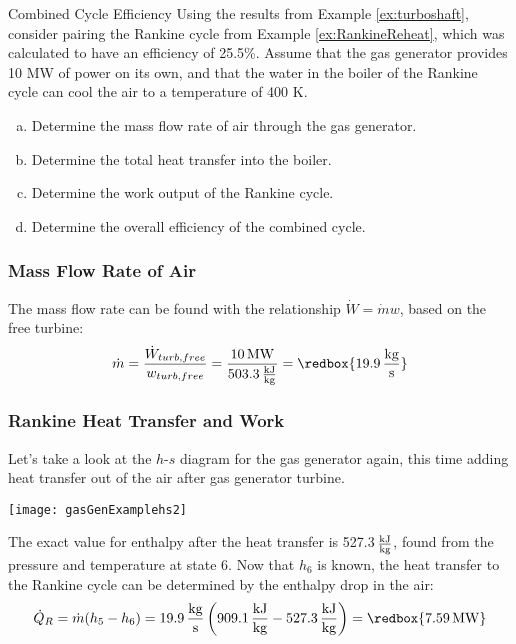\begin{example}[label=ex:combinedCycle]{Combined Cycle Efficiency}
  Using the results from Example \ref{ex:turboshaft}, consider pairing the Rankine cycle from Example \ref{ex:RankineReheat}, which was calculated to have an efficiency of 25.5\%.  Assume that the gas generator provides 10 MW of power on its own, and that the water in the boiler of the Rankine cycle can cool the air to a temperature of 400 K.
  
  \begin{enumerate}[a)]
  \item Determine the mass flow rate of air through the gas generator.
  \item Determine the total heat transfer into the boiler.
  \item Determine the work output of the Rankine cycle.
  \item Determine the overall efficiency of the combined cycle.
  \end{enumerate}

  \subsubsection*{Mass Flow Rate of Air}
  The mass flow rate can be found with the relationship $\dot{W} = \dot{m} w$, based on the free turbine:
  \begin{equation*}
    \dot{m} = \frac{\dot{W}_{turb, free}}{w_{turb, free}} = \frac{10\, {\rm MW}}{503.3\, \frac{\rm kJ}{\rm kg}} = \redbox{19.9\, \frac{\rm kg}{\rm s}}
  \end{equation*}

  \subsubsection*{Rankine Heat Transfer and Work}
  Let's take a look at the $h$-$s$ diagram for the gas generator again, this time adding heat transfer out of the air after gas generator turbine.

  \begin{center}
    \texttt{[image: gasGenExamplehs2]}
  \end{center}
  The exact value for enthalpy after the heat transfer is 527.3\,$\frac{\rm kJ}{\rm kg}$, found from the pressure and temperature at state 6.  Now that $h_6$ is known, the heat transfer to the Rankine cycle can be determined by the enthalpy drop in the air:
  \begin{equation*}
    \dot{Q}_{R} = \dot{m} (h_5-h_6) = 19.9\, \frac{\rm kg}{\rm s} \left(909.1\, \frac{\rm kJ}{\rm kg} - 527.3\, \frac{\rm kJ}{\rm kg}\right) = \redbox{7.59\, {\rm MW}}
  \end{equation*}


\end{example}
